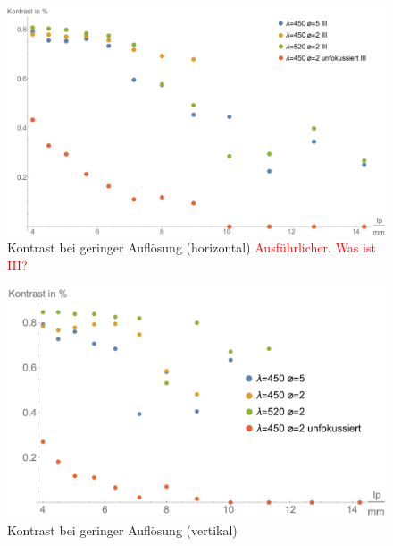 \begin{minipage}{\linewidth}
\begin{figure}[H]
	\centering
\includegraphics[width=1.0\linewidth]{IMAGE/Versuch2Plot1horizontal2.pdf}
	\caption{Kontrast bei geringer Auflösung (horizontal) \textcolor{red}{Ausführlicher. Was ist III?}}
	\label{fig:Versuch2_Plot2h1}
\end{figure} 

\begin{figure}[H]
	\centering
\includegraphics[width=1.0\linewidth]{IMAGE/Versuch2Plot1vertikal2.pdf}
	\caption{Kontrast bei geringer Auflösung (vertikal)}
	\label{fig:Versuch2_Plot2v1}
\end{figure} 

\end{minipage}

